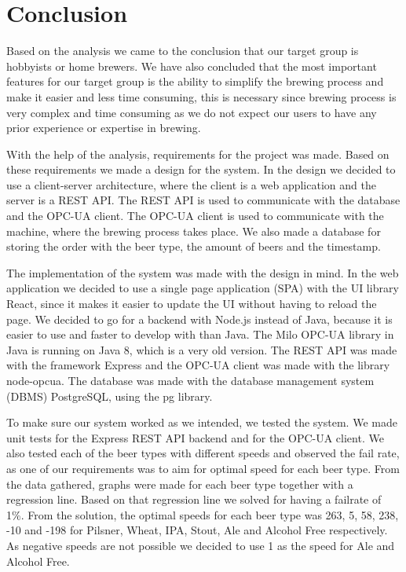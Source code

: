 \section{Conclusion}
Based on the analysis we came to the conclusion that our target group is hobbyists or home brewers.
We have also concluded that the most important features for our target group is the ability to simplify the brewing process and
make it easier and less time consuming, this is necessary since brewing process is very complex and time consuming
as we do not expect our users to have any prior experience or expertise in brewing.\newline

With the help of the analysis, requirements for the project was made.
Based on these requirements we made a design for the system.
In the design we decided to use a client-server architecture, where the client is a web application and the server is a REST API.
The REST API is used to communicate with the database and the OPC-UA client.
The OPC-UA client is used to communicate with the machine, where the brewing process takes place.
We also made a database for storing the order with the beer type, the amount of beers and the timestamp.\newline

The implementation of the system was made with the design in mind.
In the web application we decided to use a single page application (SPA) with the UI library React,
since it makes it easier to update the UI without having to reload the page.
We decided to go for a backend with Node.js instead of Java, because it is easier to use and faster to develop with than Java.
The Milo OPC-UA library in Java is running on Java 8, which is a very old version.
The REST API was made with the framework Express and the OPC-UA client was made with the library node-opcua.
The database was made with the database management system (DBMS) PostgreSQL, using the pg library.\newline

To make sure our system worked as we intended, we tested the system.
We made unit tests for the Express REST API backend and for the OPC-UA client.
We also tested each of the beer types with different speeds and observed the fail rate,
as one of our requirements was to aim for optimal speed for each beer type.
From the data gathered, graphs were made for each beer type together with a regression line.
Based on that regression line we solved for having a failrate of 1\%.
From the solution, the optimal speeds for each beer type was 263, 5, 58, 238, -10 and -198 for Pilsner, Wheat, IPA, Stout, Ale and Alcohol Free respectively.
As negative speeds are not possible we decided to use 1 as the speed for Ale and Alcohol Free.\newline